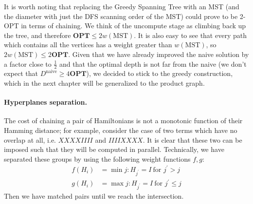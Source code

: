 \documentclass{article}
\begin{document}
\begin{multicols}{2}
It is worth noting that replacing the Greedy Spanning Tree with an MST (and the diameter with just the DFS scanning order of the MST) could prove to be 2-OPT in terms of chaining. We think of the uncompute stage as climbing back up the tree, and therefore \( \textbf{OPT} \le 2w\left(\text{MST} \right) \). It is also easy to see that every path which contains all the vertices has a weight greater than \(w\left(\text{MST} \right) \), so \(2w\left(\text{MST} \right) \le 2\textbf{OPT}\).          
Given that we have already improved the naive solution by a factor close to \(\frac{1}{2}\) and that the optimal depth is not far from the naive (we don't expect that \( D^{\text{naive}} \ge 4 \textbf{OPT} \)), we decided to stick to the greedy construction, which in the next chapter will be generalized to the product graph.

\paragraph{Hyperplanes separation.} The cost of chaining a pair of Hamiltonians is not a monotonic function of their Hamming distance; for example, consider the case of two terms which have no overlap at all, i.e. \(XXXXIIII\) and \(IIIIXXXX\). It is clear that these two can be imposed such that they will be computed in parallel. 
Technically, we have separated these groups by using the following weight functions \(f,g\):
\begin{equation*}
    \begin{split}
        f\left(H_{i}\right) &= \min {j : H_{j^{\prime}} = I \ \text{for } j^{\prime} > j } \\
        g\left(H_{i}\right) &= \max {j : H_{j^{\prime}} = I \ \text{for } j^{\prime} \le j }
    \end{split}
\end{equation*}    
Then we have matched pairs until we reach the intersection.
\end{multicols}

\end{document}
